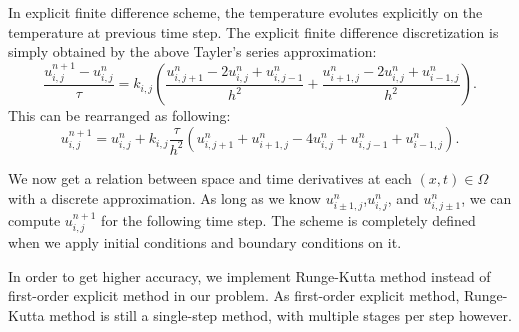 \documentclass[10pt,a4paper]{report}
\begin{document}
In explicit finite difference scheme, the temperature evolutes explicitly on the temperature at previous time step. The explicit finite difference discretization is simply obtained by the above Tayler's series approximation: 
\begin{equation}
{\frac{u^{n+1}_{i,j}-u^n_{i,j}}{\tau}}=k_{i,j}({\frac{u^n_{i,j+1}-2u^n_{i,j}+u^n_{i,j-1}}{h^2}}+{\frac{u^n_{i+1,j}-2u^n_{i,j}+u^n_{i-1,j}}{h^2}}).
\end{equation}
This can be rearranged as following:
\begin{equation}
u^{n+1}_{i,j}=u^{n}_{i,j}+k_{i,j}{\frac{\tau}{h^2}}(u^n_{i,j+1}+u^n_{i+1,j}-4u^n_{i,j}+u^n_{i,j-1}+u^n_{i-1,j}).
\end{equation}

We now get a relation between space and time derivatives at each $(x,t)\in \Omega$ with a discrete approximation. As long as we know $u^n_{i\pm 1,j}$,$u^n_{i,j}$, and $u^n_{i,j\pm 1}$, we can compute $u^{n+1}_{i,j}$ for the following time step. The scheme is completely defined when we apply initial conditions and boundary conditions on it.

In order to get higher accuracy, we implement Runge-Kutta method instead of first-order explicit method in our problem. As first-order explicit method, Runge-Kutta method is still a single-step method, with multiple stages per step however. 
\end{document}
